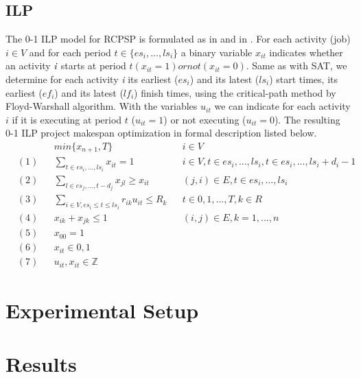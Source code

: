 \documentclass{sig-alternate}
\begin{document}
\subsection{ILP}
The 0-1 ILP model for RCPSP is formulated as in \cite{horbach2010boolean} and in \cite{mingozzi1998exact}.
For each activity (job) $i \in V$ and for each period $t \in \{es_i,...,ls_i\}$ a binary variable $x_{it}$ indicates whether an activity $\emph{i}$ starts at period $t (x_{it} = 1) or not (x_{it} = 0)$.
Same as with SAT, we determine for each activity \emph{i} its earliest ($es_i$) and its latest ($ls_i$) start times, its earliest ($ef_i$) and its latest ($lf_i$) finish times, using the critical-path method by Floyd-Warshall algorithm.
With the variables $u_{it}$ we can indicate for each activity $i$ if it is executing at period $t$ ($u_{it} = 1$) or not executing ($u_{it} = 0$).
The resulting 0-1 ILP project makespan optimization in formal description listed below.
\begin{subequations}
\begin{align*}
        & & & min\{x_{n+1},T\} & & {i} \in {V} \\
        &  (1) & & \sum\limits_{{t}\in{es_i,...,ls_i}} {x_{it}} = 1 & & {i} \in {V}, {t} \in {es_i,...,ls_i}, {t} \in {es_i,...,ls_i} + {d_i} - 1 \\
        &  (2) & & \sum\limits_{{l}\in{es_j,...,t-d_j}} {x_{jl}} \geq {x_{it}} & & {(j,i)} \in {E}, {t} \in {es_i,...,ls_i} \\
        &  (3) & & \sum\limits_{{i}\in{V,}{es_i}\leq{t}\leq{ls_i}} {r_{ik}}{u_{it}} \leq {R_k} & & {t} \in {0,1,...,{T}}, {k} \in {R} \\
        &  (4) & & {x_{ik}} + {x_{jk}} \leq 1 & & (i,j) \in E, {k} = 1,...,{n} \\
        &  (5) & & {x_{00}} = 1 & & \\
        &  (6) & & {x_{it}} \in {0, 1} & & \\
        &  (7) & & {u_{it}}, {x_{it}} \in \mathbb{Z} & &
\end{align*}
\end{subequations}

\section{Experimental Setup}

\section{Results}
\end{document}

